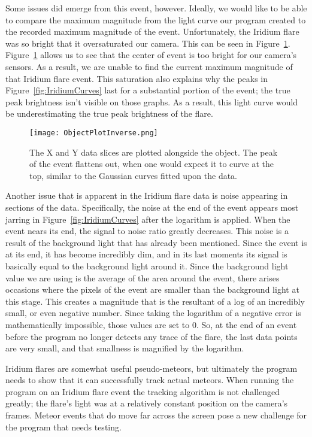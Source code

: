 Some issues did emerge from this event, however. Ideally, we would like to be able to compare the maximum magnitude from the light curve our program created to the recorded maximum magnitude of the event. Unfortunately, the Iridium flare was so bright that it oversaturated our camera. This can be seen in Figure~\ref{fig:ObjectPlot055}. Figure~\ref{fig:ObjectPlot055} allows us to see that the center of event is too bright for our camera's sensors. As a result, we are unable to find the current maximum magnitude of that Iridium flare event. This saturation also explains why the peaks in Figure~\ref{fig:IridiumCurves} last for a substantial portion of the event; the true peak brightness isn't visible on those graphs. As a result, this light curve would be underestimating the true peak brightness of the flare.

\begin{figure}[ht!]
	\centering
	\texttt{[image: ObjectPlotInverse.png]}
	\caption{The X and Y data slices are plotted alongside the object. The peak of the event flattens out, when one would expect it to curve at the top, similar to the Gaussian curves fitted upon the data.}
	\label{fig:ObjectPlot055}
\end{figure}

Another issue that is apparent in the Iridium flare data is noise appearing in sections of the data. Specifically, the noise at the end of the event appears most jarring in Figure~\ref{fig:IridiumCurves} after the logarithm is applied. When the event nears its end, the signal to noise ratio greatly decreases. This noise is a result of the background light that has already been mentioned. Since the event is at its end, it has become incredibly dim, and in its last moments its signal is basically equal to the background light around it. Since the background light value we are using is the average of the area around the event, there arises occasions where the pixels of the event are smaller than the background light at this stage. This creates a magnitude that is the resultant of a log of an incredibly small, or even negative number. Since taking the logarithm of a negative error is mathematically impossible, those values are set to 0. So, at the end of an event before the program no longer detects any trace of the flare, the last data points are very small, and that smallness is magnified by the logarithm.

Iridium flares are somewhat useful pseudo-meteors, but ultimately the program needs to show that it can successfully track actual meteors. When running the program on an Iridium flare event the tracking algorithm is not challenged greatly; the flare's light was at a relatively constant position on the camera's frames. Meteor events that do move far across the screen pose a new challenge for the program that needs testing.

